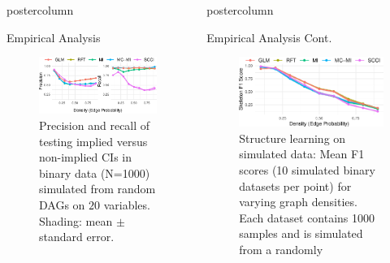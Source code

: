 \documentclass{beamer}
\newlength{\columnheight}
\begin{document}
\begin{frame}
\begin{columns}
\begin{column}{.33\textwidth}
\begin{beamercolorbox}[center]{postercolumn}
\begin{minipage}{.98\textwidth}
{\begin{myblock}{Empirical Analysis}
\begin{figure}
							\includegraphics[scale=3]{../in_person/imgs/model_testing.pdf}
							\caption{Precision and recall of testing implied versus non-implied CIs
								 in binary data (N=1000) simulated from random DAGs on $ 20 $ variables.
								 Shading: mean $\pm$ standard error.} 
							\label{fig:model_testing}
						\end{figure}
					\end{myblock}
		}\end{minipage}\end{beamercolorbox}
	\end{column}
	\begin{column}{0.33\textwidth}
		\begin{beamercolorbox}[center]{postercolumn}
			\begin{minipage}{.98\textwidth} %
				\parbox[t][\columnheight]{\textwidth}{ %
					\begin{myblock}{Empirical Analysis Cont.}
						\begin{figure}
							\centering
							\includegraphics[scale=3]{../in_person/imgs/sl_density.pdf}
							\caption{Structure learning on simulated data: Mean F1 scores (10
								 simulated binary datasets per point) for varying graph densities. Each
								 dataset contains 1000 samples and is simulated from a randomly
}
\end{figure}
\end{myblock}}
\end{minipage}
\end{beamercolorbox}
\end{column}
\end{columns}
\end{frame}
\end{document}
